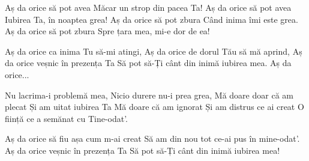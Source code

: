 
\beginverse
Aș da orice să pot avea
Măcar un strop din pacea Ta!
Aș da orice să pot avea
Iubirea Ta, în noaptea grea!
Aș da orice să pot zbura
Când inima îmi este grea.
Aș da orice să pot zbura 
Spre țara mea, mi-e dor de ea!
\endverse

\beginchorus
Aș da orice ca inima Tu să-mi atingi,
Aș da orice de dorul Tău să mă aprind,
Aș da orice veșnic în prezența Ta
Să pot să-Ți cânt din inimă iubirea mea.
Aș da orice...
\endchorus

\beginverse
Nu lacrima-i problemă mea,
Nicio durere nu-i prea grea,
Mă doare doar că am plecat
Și am uitat iubirea Ta
Mă doare că am ignorat
Și am distrus ce ai creat
O ființă ce a semănat cu Tine-odat'.
\endverse

\beginverse
Aș da orice să fiu așa cum m-ai creat
Să am din nou tot ce-ai pus în mine-odat'.
Aș da orice veșnic în prezența Ta
Să pot să-Ți cânt din inimă iubirea mea!
\endverse

\endsong